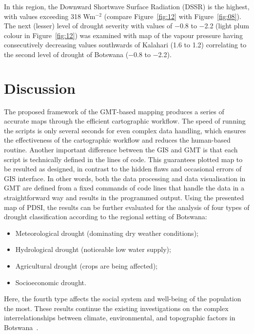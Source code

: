 \documentclass[ijgi,article,accept,pdftex,moreauthors]{Definitions/mdpi}
\begin{document}
In this region, the Downward Shortwave Surface Radiation (DSSR) is the highest, with values exceeding 318 Wm$^{-2}$ (compare Figure~\ref{fig:12} with Figure~\ref{fig:08}). The next (lesser) level of drought severity with values of $-$0.8 to $-$2.2 (light plum colour in Figure~\ref{fig:12}) was examined with map of the vapour pressure having consecutively decreasing values southwards of Kalahari (1.6 to 1.2) correlating to the second level of drought of Botswana ($-$0.8 to $-$2.2).

\section{Discussion}

The proposed framework of the GMT-based mapping produces a series of accurate maps through the efficient cartographic workflow. The speed of running the scripts is only several seconds for even complex data handling, which ensures the effectiveness of the cartographic workflow and reduces the human-based routine. Another important difference between the GIS and GMT is that each script is technically defined in the lines of code. This guarantees plotted map to be resulted as designed, in contrast to the hidden flaws and occasional errors of GIS interface. In other words, both the data processing and data visualisation in GMT are defined from a fixed commands of code lines that handle the data in a straightforward way and results in the programmed output. Using the presented map of PDSI, the results can be further evaluated for the analysis of four types of drought classification according to the regional setting of Botswana: 

    \begin{itemize}
        \item[$-$] Meteorological drought (dominating dry weather conditions); 
        \item[$-$] Hydrological drought (noticeable low water supply); 
        \item[$-$] Agricultural drought (crops are being affected); 
        \item[$-$] Socioeconomic drought. 
   \end{itemize} 
      
        Here, the fourth type  affects the social system and well-being of the population the most. These results continue the existing investigations on the complex interrelationships between climate, environmental, and topographic factors in Botswana~\cite{McGill,Maoyi,Ramberg2006b}. 
\end{document}
